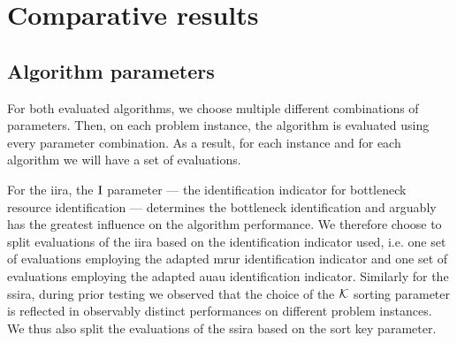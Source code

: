\section{Comparative results} \label{sec:numerical-experiments/comparative-results}


\subsection{Algorithm parameters} \label{subsec:numerical-experiments/comparative-results/algorithm-parameters}

For both evaluated algorithms, we choose multiple different combinations of parameters.
Then, on each problem instance, the algorithm is evaluated using every parameter combination.
As a result, for each instance and for each algorithm we will have a set of evaluations.

For the \ac{iira}, the $\mathrm{I}$ parameter ---
the identification indicator for bottleneck resource identification ---
determines the bottleneck identification and arguably has the greatest influence on the algorithm performance.
We therefore choose to split evaluations of the \ac{iira} based on the identification indicator used,
i.e. one set of evaluations employing the adapted \ac{mrur} identification indicator
and one set of evaluations employing the adapted \ac{auau} identification indicator.
Similarly for the \ac{ssira}, during prior testing we observed
that the choice of the $\mathcal{K}$ sorting parameter
is reflected in observably distinct performances on different problem instances.
We thus also split the evaluations of the \ac{ssira} based on the sort key parameter.


